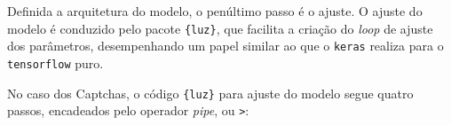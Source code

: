 \documentclass[12pt,twoside,brazilian]{book}
\newenvironment{Shaded}{\begin{snugshade}}{\end{snugshade}}
\newcommand{\DecValTok}[1]{\textcolor[rgb]{0.68,0.00,0.00}{#1}}
\newcommand{\FunctionTok}[1]{\textcolor[rgb]{0.28,0.35,0.67}{#1}}
\newcommand{\NormalTok}[1]{\textcolor[rgb]{0.00,0.23,0.31}{#1}}
\newcommand{\SpecialCharTok}[1]{\textcolor[rgb]{0.37,0.37,0.37}{#1}}
\begin{document}
\begin{Shaded}
\end{Shaded}

Definida a arquitetura do modelo, o penúltimo passo é o ajuste. O ajuste
do modelo é conduzido pelo pacote \texttt{\{luz\}}, que facilita a
criação do \emph{loop} de ajuste dos parâmetros, desempenhando um papel
similar ao que o \texttt{keras} realiza para o \texttt{tensorflow} puro.

No caso dos Captchas, o código \texttt{\{luz\}} para ajuste do modelo
segue quatro passos, encadeados pelo operador \emph{pipe}, ou
\texttt{\textbar{}\textgreater{}}:
\end{document}
